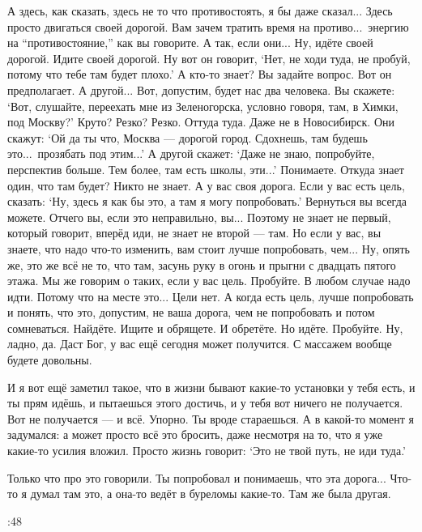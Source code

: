 \A
А здесь, как сказать, здесь не то что противостоять, я бы даже сказал...
Здесь просто двигаться своей дорогой.
Вам зачем тратить время на противо...\ энергию на ``противостояние,'' как вы говорите.
А так, если они... Ну, идёте своей дорогой. Идите своей дорогой.
Ну вот он говорит, `Нет, не ходи туда, не пробуй, потому что тебе там будет плохо.'
А кто-то знает?
Вы задайте вопрос. Вот он предполагает. А другой... Вот, допустим, будет нас два человека.
Вы скажете: `Вот, слушайте, переехать мне из Зеленогорска, условно говоря, там, в Химки,
под Москву?' Круто? Резко? Резко. Оттуда туда. Даже не в Новосибирск.
Они скажут: `Ой да ты что, Москва --- дорогой город. Сдохнешь, там будешь это...\
прозябать под этим...'
А другой скажет: `Даже не знаю, попробуйте, перспектив больше. Тем более, там есть школы, эти...'
Понимаете.
Откуда знает один, что там будет? Никто не знает. А у вас своя дорога.
Если у вас есть цель, сказать: `Ну, здесь я как бы это, а там я могу попробовать.'
Вернуться вы всегда можете.
Отчего вы, если это неправильно, вы...
Поэтому не знает не первый, который говорит, вперёд иди, не знает не второй --- там.
Но если у вас, вы знаете, что надо что-то изменить, вам стоит лучше попробовать, чем...
Ну, опять же, это же всё не то, что там, засунь руку в огонь и прыгни с двадцать пятого этажа.
Мы же говорим о таких, если у вас цель.
Пробуйте.
В любом случае надо идти.
Потому что на месте это...
Цели нет.
А когда есть цель, лучше попробовать и понять, что это, допустим, не ваша дорога, чем не
попробовать и потом сомневаться.
Найдёте.
Ищите и обрящете.
И обретёте.
Но идёте.
Пробуйте.
Ну, ладно, да.
Даст Бог, у вас ещё сегодня может получится.
С массажем вообще будете довольны.

\I
И я вот ещё заметил такое, что в жизни бывают какие-то установки у тебя есть, и ты прям идёшь,
и пытаешься этого достичь, и у тебя вот ничего не получается.
Вот не получается --- и всё. Упорно.
Ты вроде стараешься.
А в какой-то момент я задумался:
а может просто всё это бросить, даже несмотря на то, что я уже какие-то усилия вложил.
Просто жизнь говорит:
`Это не твой путь, не иди туда.'

\A
Только что про это говорили.
Ты попробовал и понимаешь, что эта дорога...
Что-то я думал там это, а она-то ведёт в буреломы какие-то.
Там же была другая.

:48

